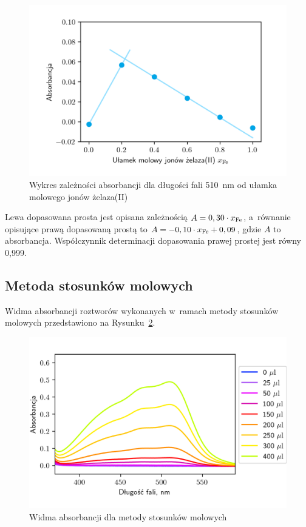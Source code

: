 \documentclass[12pt]{article}
\begin{document}
\begin{figure}[H]
    \begin{center}
        \includegraphics[height=7.5cm]{ChFizLab_R3_A(xFe).png}
    \end{center}
    \caption{Wykres zależności absorbancji dla długości fali 510~nm od ułamka molowego jonów żelaza(II)}
    \label{AxFe}
\end{figure}

Lewa dopasowana prosta jest opisana zależnością $A = 0,30 \cdot x_{\ce{Fe}}$, a~równanie opisujące prawą dopasowaną prostą to $A = -0,10 \cdot x_{\ce{Fe}} + 0,09$, gdzie $A$ to absorbancja. Współczynnik determinacji dopasowania prawej prostej jest równy 0,999.


\subsection{Metoda stosunków molowych}

Widma absorbancji roztworów wykonanych w~ramach metody stosunków molowych przedstawiono na Rysunku~\ref{widma2}.

\begin{figure}[H]
    \begin{center}
        \includegraphics{ChFizLab_R3_widma2.png}
    \end{center}
    \caption{Widma absorbancji dla metody stosunków molowych}
    \label{widma2}
\end{figure}
\end{document}
